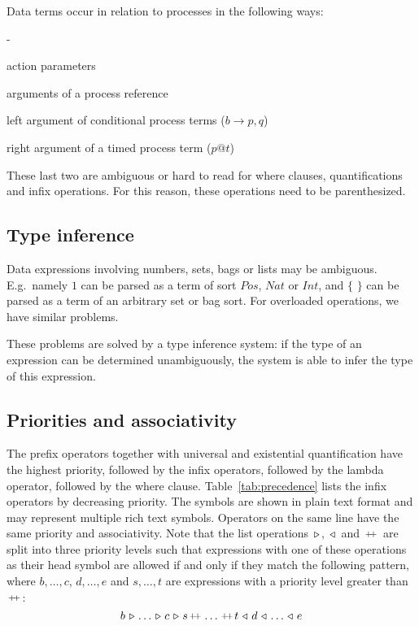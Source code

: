 \documentclass[a4paper,fleqn]{article}
\newenvironment{tdefinitions}[2][0.15em]
  {\begin{list}%
    {#2}%
    {\setlength{\parsep}{0pt}%
     \setlength{\itemsep}{#1}%
     \setlength{\leftmargin}{\mathindent}%
     \setlength{\labelwidth}{\mathindent - \labelsep}%
    }
  }
  {\end{list}}
\newcommand{\frm}[1]{\mbox{\ensuremath{#1}}}
\newcommand{\f}[1]{\ensuremath{\mathit{#1}}}
\newcommand{\To}{\ensuremath{\rightarrow}}
\newcommand{\set}[1]{\ensuremath{\{\,#1\,\}}}
\newcommand{\cons}{\ensuremath{\hspace{0.12em}\triangleright\hspace{0.08em}}}
\newcommand{\snoc}{\ensuremath{\hspace{0.08em}\triangleleft\hspace{0.12em}}}
\newcommand{\concat}{\ensuremath{\hspace{0.12em}\raisebox{0.2ex}
{\text{\scriptsize+}\!\text{\scriptsize+}}\hspace{0.12em}}}
\newlength{\tlength}
\newcommand{\srtpos}{\f{Pos}}
\newcommand{\srtnat}{\f{Nat}}
\newcommand{\srtint}{\f{Int}}
\begin{document}
\noindent
Data terms occur in relation to processes in the following ways:
\begin{tdefinitions}{-}
\item action parameters
\item arguments of a process reference
\item left argument of conditional process terms (\frm{b \To p,q})
\item right argument of a timed process term (\frm{p @ t})
\end{tdefinitions}

\noindent
These last two are ambiguous or hard to read for where clauses, quantifications
and infix operations. For this reason, these operations need to be
parenthesized.

\subsection{Type inference}

Data expressions involving numbers, sets, bags or lists may be ambiguous. E.g.\
namely \frm{1} can be parsed as a term of sort \frm{\srtpos}, \frm{\srtnat} or
\frm{\srtint}, and \frm{\set{}} can be parsed as a term of an arbitrary set or
bag sort. For overloaded operations, we have similar problems.

These problems are solved by a type inference system: if the type of an
expression can be determined unambiguously, the system is able to infer the
type of this expression.

\subsection{Priorities and associativity}

The prefix operators together with universal and existential quantification
have the highest priority, followed by the infix operators, followed by the
lambda operator, followed by the where clause. Table~\ref{tab:precedence} lists
the infix operators by decreasing priority. The symbols are shown in plain text
format and may represent multiple rich text symbols. Operators on the same line
have the same priority and associativity. Note that the list operations
\frm{\cons}, \frm{\snoc} and \frm{\concat} are split into three priority levels
such that expressions with one of these operations as their head symbol are
allowed if and only if they match the following pattern, where \frm{b, \ldots,
c}, \frm{d, \ldots, e} and \frm{s, \ldots, t} are expressions with a priority
level greater than \frm{\concat}:
\[
b \cons \dots \cons c \cons s \concat \dots \concat t \snoc d \snoc \dots
\snoc e
\]
 
\end{document}
